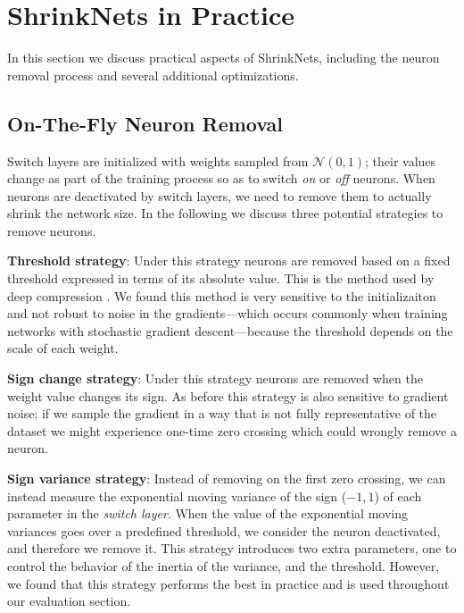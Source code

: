 
\section{ShrinkNets in Practice}

In this section we discuss practical aspects of ShrinkNets, including the
neuron removal  process and several additional optimizations.

\subsection{On-The-Fly Neuron Removal}
\label{neuron_killing}

Switch layers are initialized with weights sampled from $\mathcal{N}(0,1)$;
their values change as part of the training process so as to switch \emph{on}
or \emph{off} neurons. When neurons are deactivated by switch layers, we need
to remove them to actually shrink the network size.
In the following we discuss three potential strategies to remove neurons. 

\textbf{Threshold strategy}: Under this strategy neurons are removed based on
a fixed threshold expressed in terms of its absolute value. This is the method
used by deep compression \cite{}. We found this method is very sensitive to the initializaiton 
and not robust to noise in the gradients---which occurs commonly when training networks with
stochastic gradient descent---because the threshold depends on the scale of
each weight.

\textbf{Sign change strategy}: Under this strategy neurons are removed when the
weight value changes its sign. As before this strategy is also sensitive to gradient noise; if we sample the gradient in a way that is not fully representative of the dataset we might experience one-time zero crossing which could wrongly remove a neuron.

\textbf{Sign variance strategy}: Instead of removing on the first zero
crossing, we can instead measure the exponential moving variance of the sign
($-1, 1$) of each parameter in the \textit{switch layer}. When the value of
the exponential moving variances goes over a predefined threshold, we consider
the neuron deactivated, and therefore we remove it. This strategy introduces
two extra parameters, one to control the behavior of the inertia of the
variance, and the threshold. 
However, we found that this strategy performs the best in practice and is used throughout our evaluation section. 


